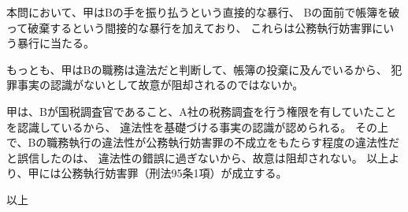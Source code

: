 \documentclass[11pt]{jsarticle}
\begin{document}
		本問において、甲はBの手を振り払うという直接的な暴行、
		Bの面前で帳簿を破って破棄するという間接的な暴行を加えており、
		これらは公務執行妨害罪にいう暴行に当たる。
		
	\sectionC{}
		もっとも、甲はBの職務は違法だと判断して、帳簿の投棄に及んでいるから、
		犯罪事実の認識がないとして故意が阻却されるのではないか。
		
		甲は、Bが国税調査官であること、A社の税務調査を行う権限を有していたことを認識しているから、
		違法性を基礎づける事実の認識が認められる。
		その上で、Bの職務執行の違法性が公務執行妨害罪の不成立をもたらす程度の違法性だと誤信したのは、
		違法性の錯誤に過ぎないから、故意は阻却されない。
\sectionB{}
	以上より、甲には公務執行妨害罪（刑法95条1項）が成立する。






\begin{flushright}
	以上
\end{flushright}
	
\end{document}

